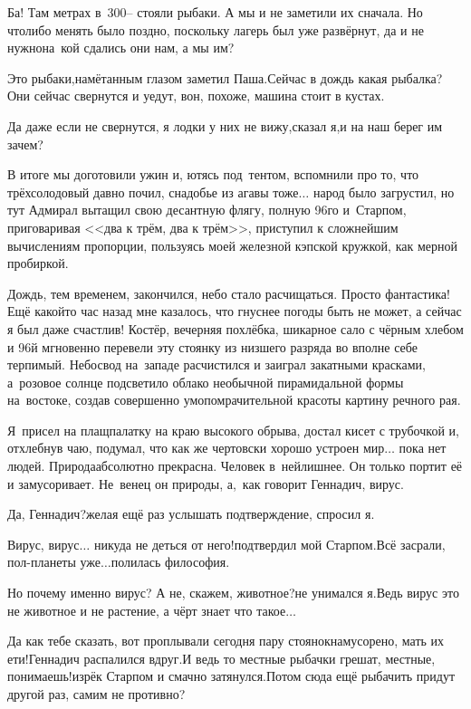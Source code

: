 Ба! Там метрах в~300\thinspace\nobreakdash-- стояли рыбаки. А мы и не заметили их сначала. Но что\sdash либо менять было поздно, поскольку лагерь был уже развёрнут, да и не нужно\mdash на~кой сдались они нам, а мы им?

\diagdash Это рыбаки,\mdash намётанным глазом заметил Паша.\mdash Сейчас в дождь какая рыбалка? Они сейчас свернутся и уедут, вон, похоже, машина стоит в кустах.

\diagdash Да даже если не свернутся, я лодки у них не вижу,\mdash сказал я,\mdash и на наш берег им зачем?

В итоге мы доготовили ужин и, ютясь под~тентом, вспомнили про то, что трёхсолодовый давно почил, снадобье из агавы тоже$\ldots$ народ было загрустил, но тут Адмирал вытащил свою десантную флягу, полную 96\sdash го и~Старпом, приговаривая <<два к трём, два к трём>>, приступил к сложнейшим вычислениям пропорции, пользуясь моей железной кэпской кружкой, как мерной пробиркой. 

Дождь, тем временем, закончился, небо стало расчищаться. Просто фантастика! Ещё какой\sdash то час назад мне казалось, что гнуснее погоды быть не может, а сейчас я был даже счастлив! Костёр, вечерняя похлёбка, шикарное сало с чёрным хлебом и 96\sdash й мгновенно перевели эту стоянку из низшего разряда во вполне себе терпимый. Небосвод на~западе расчистился и заиграл закатными красками, а~розовое солнце подсветило облако необычной пирамидальной формы на~востоке, создав совершенно умопомрачительной красоты картину речного рая. 

Я~присел на плащ\sdash палатку на краю высокого обрыва, достал кисет с трубочкой и, отхлебнув чаю, подумал, что как же чертовски хорошо устроен мир$\ldots$ пока нет людей. Природа\mdash абсолютно прекрасна. Человек в~ней\mdash лишнее. Он только портит её и замусоривает. Не~венец он природы, а,~как говорит Геннадич, вирус.

\diagdash Да, Геннадич?\mdash желая ещё раз услышать подтверждение, спросил я.

\diagdash Вирус, вирус$\ldots$ никуда не деться от него!\mdash подтвердил мой Старпом.\mdash Всё засрали, пол-планеты уже$\ldots$\mdash полилась философия.

\diagdash Но почему именно вирус? А не, скажем, животное?\mdash не унимался я.\mdash Ведь вирус это не животное и не растение, а чёрт знает что такое$\ldots$

\diagdash Да как тебе сказать, вот проплывали сегодня пару стоянок\mdash намусорено, мать их ети!\mdash Геннадич распалился вдруг.\mdash И ведь то местные рыбачки грешат, местные, понимаешь!\mdash изрёк Старпом и смачно затянулся.\mdash Потом сюда ещё рыбачить придут другой раз, самим не противно?

